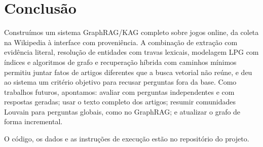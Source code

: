 \documentclass[12pt]{article}
\begin{document}
\section{Conclusão}
Construímos um sistema GraphRAG/KAG completo sobre jogos online, da coleta na Wikipedia à interface com proveniência. A combinação de extração com evidência literal, resolução de entidades com travas lexicais, modelagem LPG com índices e algoritmos de grafo e recuperação híbrida com caminhos mínimos permitiu juntar fatos de artigos diferentes que a busca vetorial não reúne, e deu ao sistema um critério objetivo para recusar perguntas fora da base. Como trabalhos futuros, apontamos: avaliar com perguntas independentes e com respostas geradas; usar o texto completo dos artigos; resumir comunidades Louvain para perguntas globais, como no GraphRAG; e atualizar o grafo de forma incremental.

O código, os dados e as instruções de execução estão no repositório do projeto.


\end{document}
